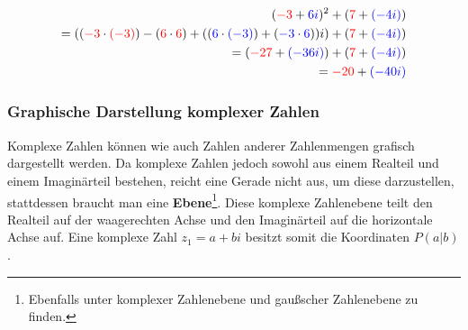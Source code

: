 \begin{equation}\label{eq:complex-numbers-example}
  \begin{split}
    (\begingroup\color{red} -3\endgroup + \begingroup\color{blue} 6i\endgroup)^2
      + (\begingroup\color{red} 7\endgroup + \begingroup\color{blue} (-4i)\endgroup) \\
    = (
        (\begingroup\color{red} -3\endgroup \cdot \begingroup\color{red} (-3)\endgroup)
          - (\begingroup\color{red} 6\endgroup \cdot \begingroup\color{red} 6\endgroup)
        + (
          (\begingroup\color{blue} 6\endgroup \cdot \begingroup\color{blue} (-3)\endgroup)
          + (\begingroup\color{blue} -3\endgroup \cdot \begingroup\color{blue} 6\endgroup)
        )i
      )
      + (\begingroup\color{red} 7\endgroup + \begingroup\color{blue} (-4i)\endgroup) \\
    = (\begingroup\color{red} -27\endgroup + \begingroup\color{blue} (-36i)\endgroup)
      + (\begingroup\color{red} 7\endgroup + \begingroup\color{blue} (-4i)\endgroup) \\
    = \begingroup\color{red} -20\endgroup + \begingroup\color{blue} (-40i)\endgroup
  \end{split}
\end{equation}

\subsubsection{Graphische Darstellung komplexer Zahlen}

Komplexe Zahlen können wie auch Zahlen anderer Zahlenmengen grafisch
dargestellt werden.
Da komplexe Zahlen jedoch sowohl aus einem Realteil und einem Imagin\"arteil
bestehen, reicht eine Gerade nicht aus, um diese darzustellen, stattdessen
braucht man eine \textbf{Ebene}\footnote{
  Ebenfalls unter komplexer Zahlenebene und gaußscher Zahlenebene zu finden.
}.
Diese komplexe Zahlenebene teilt den Realteil auf der waagerechten Achse und
den Imagin\"arteil auf die horizontale Achse auf.
Eine komplexe Zahl \(z_1 = a + bi\) besitzt somit die Koordinaten \( P(a|b)\).



